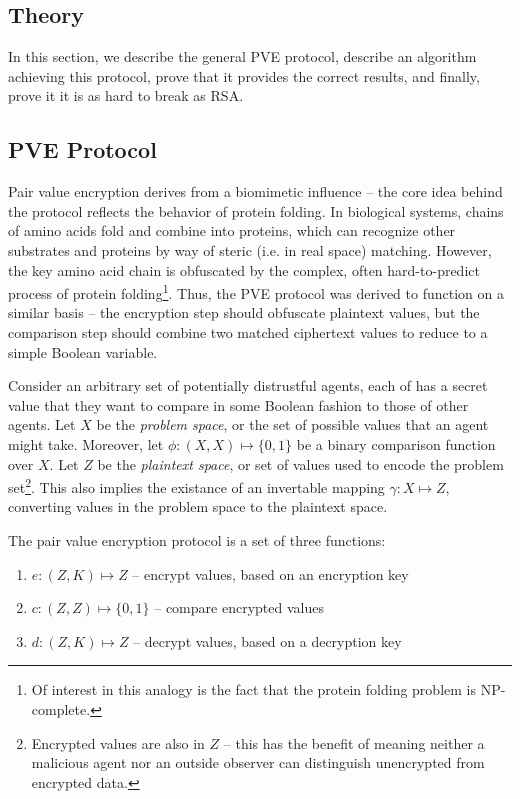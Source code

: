 \documentclass{article}
\begin{document}
\begin{multicols}{2}
\section{Theory}

In this section, we describe the general PVE protocol, describe an algorithm achieving this protocol, prove that it provides the correct results, and finally, prove it it is as hard to break as RSA.

\subsection{PVE Protocol}

Pair value encryption derives from a biomimetic influence – the core idea behind the protocol reflects the behavior of protein folding. In biological systems, chains of amino acids fold and combine into proteins, which can recognize other substrates and proteins by way of steric (i.e. in real space) matching. However, the key amino acid chain is obfuscated by the complex, often hard-to-predict process of protein folding\footnote{Of interest in this analogy is the fact that the protein folding problem is NP-complete.}. Thus, the PVE protocol was derived to function on a similar basis – the encryption step should obfuscate plaintext values, but the comparison step should combine two matched ciphertext values to reduce to a simple Boolean variable.

Consider an arbitrary set of potentially distrustful agents, each of has a secret value that they want to compare in some Boolean fashion to those of other agents. Let $X$ be the \textit{problem space}, or the set of possible values that an agent might take. Moreover, let $\phi:(X,X)\mapsto \{0,1\}$ be a binary comparison function over $X$. Let $Z$ be the \textit{plaintext space}, or set of values used to encode the problem set\footnote{Encrypted values are also in $Z$ – this has the benefit of meaning neither a malicious agent nor an outside observer can distinguish unencrypted from encrypted data.}. This also implies the existance of an invertable mapping $\gamma:X\mapsto Z$, converting values in the problem space to the plaintext space. 

The pair value encryption protocol is a set of three functions:

\begin{enumerate}
    \item $e: (Z,K) \mapsto Z$ – encrypt values, based on an encryption key
    \item $c: (Z,Z) \mapsto \{0,1\}$ – compare encrypted values
    \item $d: (Z,K) \mapsto Z$ – decrypt values, based on a decryption key
\end{enumerate}


\end{multicols}
\end{document}
